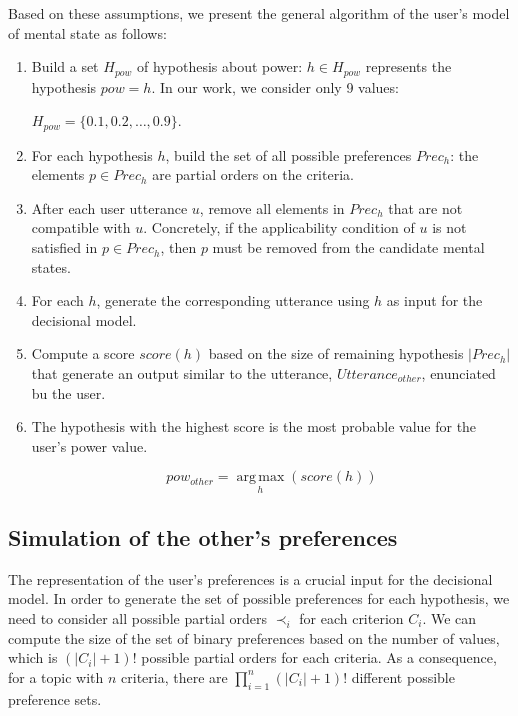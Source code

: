 \documentclass[conference, letterpaper]{IEEEtran}
\begin{document}
	Based on these assumptions, we present the general algorithm of the user's model of mental state as follows:
	\begin{enumerate}
		\item Build a set $H_{pow}$ of hypothesis about power: $h\in H_{pow}$ represents the hypothesis $pow=h$. In our work, we consider only 9 values: 
		
		$H_{pow}=\{0.1, 0.2, \ldots, 0.9\}$.
		\item For each hypothesis $h$, build the set of all possible preferences $Prec_h$: the elements $p\in Prec_h$ are partial orders on the criteria.
		\item After each user utterance $u$, remove all elements in $Prec_h$ that are not compatible with $u$. Concretely, if the applicability condition of $u$ is not satisfied in $p\in Prec_h$, then $p$ must be removed from the candidate mental states.
		\item For each $h$, generate the corresponding utterance using $h$ as input for the decisional model.
		\item Compute a score $score(h)$ based on the size of remaining hypothesis $|Prec_h|$ that generate an output similar to the utterance, $Utterance_{other}$, enunciated bu the user. 
		\item 	The hypothesis with the highest score is the most probable value for the user's power value.

		\begin{equation}
		pow_{other} = \operatorname*{arg\,max}_{h} (score(h))
		\end{equation}
		
	\end{enumerate}
		
	
	\subsection*{Simulation of the other's preferences}
	
		The representation of the user's preferences is a crucial input for the decisional model. In order to generate the set of possible preferences for each hypothesis, we need to consider all possible partial orders $\prec_i$ for each criterion $C_i$. 
		We can compute the size of the set of binary preferences based on the number of values, which is $(|C_i| + 1)!$ possible partial orders for each criteria. As a consequence, for a topic with $n$ criteria, there are $\prod_{i=1}^n (|C_i|+1)!$ different possible preference sets.
	
\end{document}
